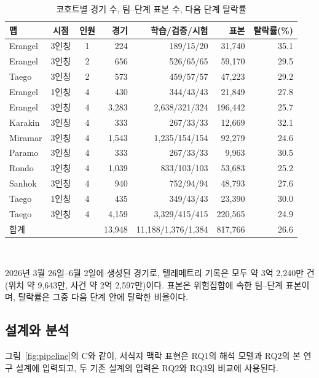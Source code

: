 \begin{table}[t]
\centering
\caption{코호트별 경기 수, 팀--단계 표본 수, 다음 단계 탈락률}
\label{tab:cohorts}
\footnotesize
\setlength{\tabcolsep}{3pt}
\begin{tabular}{lccrrrr}
\hline
맵 & 시점 & 인원 & 경기 & 학습/검증/시험 & 표본 & 탈락률(\%) \\
\hline
Erangel & 3인칭 & 1 & 224 & 189/15/20 & 31,740 & 35.1 \\
Erangel & 3인칭 & 2 & 656 & 526/65/65 & 59,170 & 29.5 \\
Taego & 3인칭 & 2 & 573 & 459/57/57 & 47,223 & 29.2 \\
Erangel & 1인칭 & 4 & 430 & 344/43/43 & 21,849 & 27.8 \\
Erangel & 3인칭 & 4 & 3,283 & 2,638/321/324 & 196,442 & 25.7 \\
Karakin & 3인칭 & 4 & 333 & 267/33/33 & 12,669 & 32.1 \\
Miramar & 3인칭 & 4 & 1,543 & 1,235/154/154 & 92,279 & 24.6 \\
Paramo & 3인칭 & 4 & 333 & 267/33/33 & 9,963 & 30.5 \\
Rondo & 3인칭 & 4 & 1,039 & 833/103/103 & 53,683 & 25.2 \\
Sanhok & 3인칭 & 4 & 940 & 752/94/94 & 48,793 & 27.6 \\
Taego & 1인칭 & 4 & 435 & 349/43/43 & 23,390 & 30.0 \\
Taego & 3인칭 & 4 & 4,159 & 3,329/415/415 & 220,565 & 24.9 \\
\hline
합계 & & & 13,948 & 11,188/1,376/1,384 & 817,766 & 26.6 \\
\hline
\end{tabular}
\\[2pt]
\parbox{\columnwidth}{\scriptsize 2026년 3월 26일--6월 2일에 생성된 경기로, 텔레메트리 기록은 모두 약 3억 2,240만 건(위치 약 9,643만, 사건 약 2억 2,597만)이다. 표본은 위험집합에 속한 팀--단계 표본이며, 탈락률은 그중 다음 단계 안에 탈락한 비율이다.}
\end{table}

\subsection{설계와 분석}
\label{sec:method:design}
그림~\ref{fig:pipeline}의 C와 같이, 서식지 맥락 표현은 RQ1의 해석 모델과 RQ2의 본 연구 설계에 입력되고, 두 기존 설계의 입력은 RQ2와 RQ3의 비교에 사용된다.

